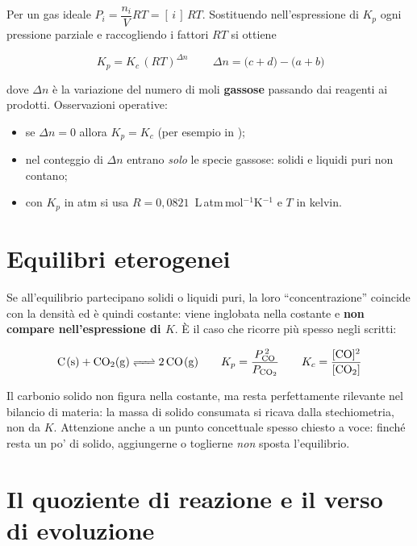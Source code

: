 \documentclass[11pt, a4paper, openright]{book}
\begin{document}
Per un gas ideale $P_i = \dfrac{n_i}{V}RT = [\,i\,]\,RT$. Sostituendo nell'espressione di
$K_p$ ogni pressione parziale e raccogliendo i fattori $RT$ si ottiene

\begin{equation}
  \boxed{\,K_p = K_c \, (RT)^{\Delta n}\,}
  \qquad
  \Delta n = \big(c + d\big) - \big(a + b\big)
  \label{eq:kpkc}
\end{equation}

dove $\Delta n$ è la variazione del numero di moli \textbf{gassose} passando dai reagenti
ai prodotti. Osservazioni operative:

\begin{itemize}
  \item se $\Delta n = 0$ allora $K_p = K_c$ (per esempio in );
  \item nel conteggio di $\Delta n$ entrano \emph{solo} le specie gassose: solidi e liquidi
        puri non contano;
  \item con $K_p$ in atm si usa $R = 0{,}0821$~L\,atm\,mol$^{-1}$K$^{-1}$ e $T$ in kelvin.
\end{itemize}


\section{Equilibri eterogenei}

Se all'equilibrio partecipano solidi o liquidi puri, la loro ``concentrazione'' coincide
con la densità ed è quindi costante: viene inglobata nella costante e \textbf{non compare
nell'espressione di $K$}. È il caso che ricorre più spesso negli scritti:

\begin{equation*}
  \ce{C(s) + CO2(g) <=> 2 CO(g)}
  \qquad
  K_p = \frac{P_{\ce{CO}}^{\,2}}{P_{\ce{CO2}}}
  \qquad
  K_c = \frac{[\ce{CO}]^2}{[\ce{CO2}]}
\end{equation*}

Il carbonio solido non figura nella costante, ma resta perfettamente rilevante nel bilancio
di materia: la massa di solido consumata si ricava dalla stechiometria, non da $K$.
Attenzione anche a un punto concettuale spesso chiesto a voce: finché resta un po' di
solido, aggiungerne o toglierne \emph{non} sposta l'equilibrio.


\section{Il quoziente di reazione e il verso di evoluzione}
\end{document}
